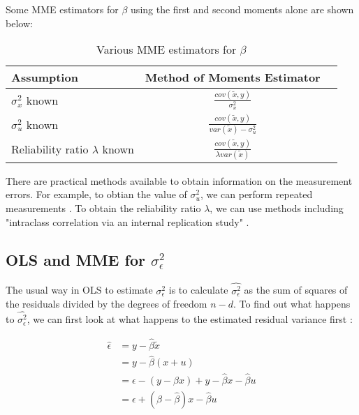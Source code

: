 \documentclass{article}
\begin{document}
Some MME estimators for $\beta$ using the first and second moments alone are shown below:

\begin{table}[ht]
    \centering
    \caption{Various MME estimators for $\beta$}
    \begin{tabular}[t]{lcc}
        \hline
        Assumption&Method of Moments Estimator\\
        \hline
        $\sigma^2_x$ known&$\frac{cov(\tilde{x}, y)}{\sigma^2_x}$\\
        $\sigma^2_u$ known&$\frac{cov(\tilde{x}, y)}{var(\tilde{x}) - \sigma^2_u}$\\
        Reliability ratio $\lambda$ known&$\frac{cov(\tilde{x}, y)}{\lambda var(\tilde{x})}$\\
        \hline
    \end{tabular}
\end{table}%

There are practical methods available to obtain information on the measurement errors. For example, to obtian the value of $\sigma^2_u$, we can perform repeated measurements \cite{mmereport}. To obtain the reliability ratio $\lambda$, we can use methods including "intraclass correlation via an internal replication study" \cite{mmereport}.

\subsection{OLS and MME for $\sigma_\epsilon^2$}

The usual way in OLS to estimate $\sigma_\epsilon^2$ is to calculate $\hat{\sigma^2_\epsilon}$ as the sum of squares of the residuals divided by the degrees of freedom $n-d$.
To find out what happens to $\hat{\sigma^2_\epsilon}$, we can first look at what happens to the estimated residual variance first \cite{lecturenotes}:

\begin{equation}
    \begin{split}
        \hat{\epsilon}  &= y - \hat{\beta} \tilde{x} \\
                        &= y - \hat{\beta}(x+u) \\
                        &= \epsilon - (y - \beta x) + y - \hat{\beta}x - \hat{\beta}u \\
                        &= \epsilon + (\beta - \hat{\beta})x - \hat{\beta}u
    \end{split} 
\end{equation}
\end{document}
